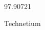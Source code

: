 \documentclass[12pt]{article}
\begin{document}
\hfill{}
\vfill
\begin{center}
  {\fontsize{50}{60}
  }

  \vspace{1em}

  97.90721

Technetium
\end{center}
\vfill
\end{document}
